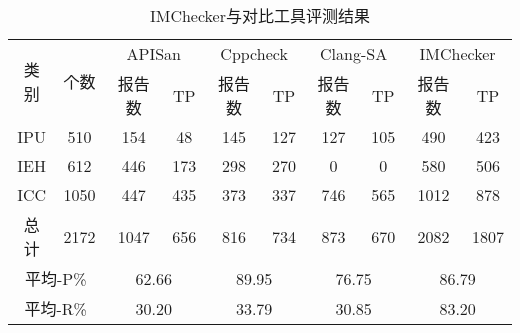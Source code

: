 \begin{table}[b]
	\centering
	\begin{minipage}[t]{0.95\linewidth} %
		\caption{IMChecker与对比工具评测结果}
		\label{tab:3-4-other}
		\begin{tabular}{@{\extracolsep{4pt}}cccccccccc@{}}
			\hline
			\multirow{2}{*}{类别 } & \multirow{2}{*}{个数} & \multicolumn{2}{c}{APISan} & \multicolumn{2}{c}{Cppcheck} & \multicolumn{2}{c}{Clang-SA} & \multicolumn{2}{c}{IMChecker}\\
			\cline{3-4} \cline{5-6} \cline{7-8} \cline{9-10}
			 & & 报告数 & TP & 报告数 & TP& 报告数 & TP & 报告数 & TP \\
			 \hline
			 IPU & 510 &  154 & 48 & 145 &127 &127 &105 & 490 & 423\\
			 IEH & 612 &  446 &173& 298& 270& 0& 0& 580& 506 \\
			 ICC & 1050 &  447 &435 &373 &337 &746& 565 &1012 &878 \\
			 总计 & 2172 &   1047& 656& 816& 734& 873& 670& 2082& 1807 \\
			 \multicolumn{2}{c}{平均-P\%} &\multicolumn{2}{c}{62.66}  & \multicolumn{2}{c}{89.95}  &\multicolumn{2}{c}{76.75}  &\multicolumn{2}{c}{86.79} \\
			 \multicolumn{2}{c}{平均-R\%} & \multicolumn{2}{c}{30.20} & \multicolumn{2}{c}{33.79}  &\multicolumn{2}{c}{30.85}  &\multicolumn{2}{c}{83.20}  \\
			\hline
		\end{tabular}
	\end{minipage}
\end{table}
